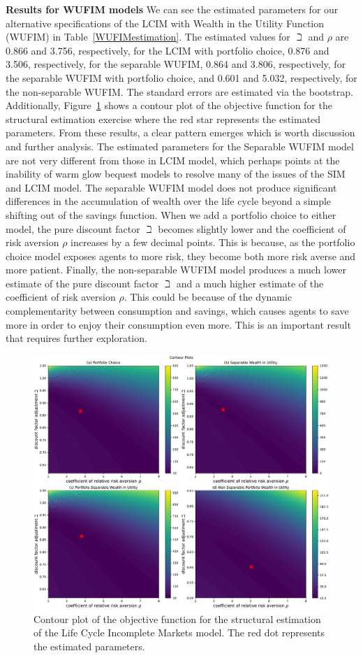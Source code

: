 \documentclass{article}
\newcommand{\CRRA}{\rho}
\begin{document}
\textbf{Results for WUFIM models} We can see the estimated parameters for our alternative specifications of the LCIM with Wealth in the Utility Function (WUFIM) in Table~\ref{WUFIMestimation}. The estimated values for $\beth$ and $\CRRA$ are 0.866 and 3.756, respectively, for the LCIM with portfolio choice, 0.876 and 3.506, respectively, for the separable WUFIM, 0.864 and 3.806, respectively, for the separable WUFIM with portfolio choice, and 0.601 and 5.032, respectively, for the non-separable WUFIM. The standard errors are estimated via the bootstrap. Additionally, Figure~\ref{fig:AllSMMcontour} shows a contour plot of the objective function for the structural estimation exercise where the red star represents the estimated parameters. From these results, a clear pattern emerges which is worth discussion and further analysis. The estimated parameters for the Separable WUFIM model are not very different from those in LCIM model, which perhaps points at the inability of warm glow bequest models to resolve many of the issues of the SIM and LCIM model. The separable WUFIM model does not produce significant differences in the accumulation of wealth over the life cycle beyond a simple shifting out of the savings function. When we add a portfolio choice to either model, the pure discount factor $\beth$ becomes slightly lower and the coefficient of risk aversion $\CRRA$ increases by a few decimal points. This is because, as the portfolio choice model exposes agents to more risk, they become both more risk averse and more patient. Finally, the non-separable WUFIM model produces a much lower estimate of the pure discount factor $\beth$ and a much higher estimate of the coefficient of risk aversion $\CRRA$. This could be because of the dynamic complementarity between consumption and savings, which causes agents to save more in order to enjoy their consumption even more. This is an important result that requires further exploration.

\begin{figure}[!htbp]
\centering
\includegraphics[width=0.7\linewidth]{files/AllSMMcontour-61083533183861c53042688308f7803e.pdf}
\caption{Contour plot of the objective function for the structural estimation of the Life Cycle Incomplete Markets model. The red dot represents the estimated parameters.}
\label{fig:AllSMMcontour}
\end{figure}
\end{document}
